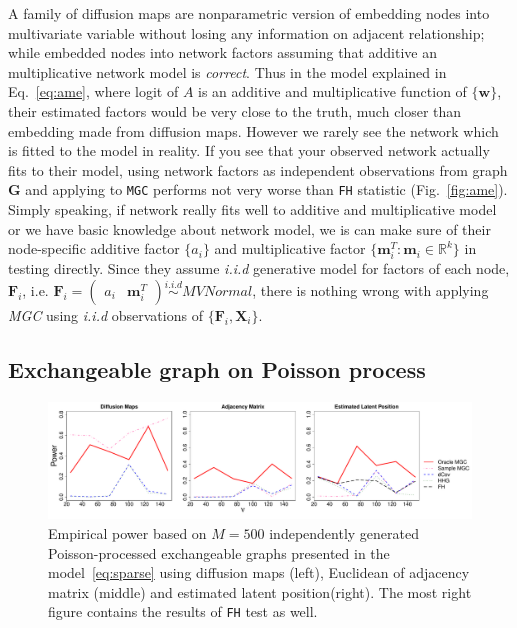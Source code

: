 \documentclass[12pt]{article}
\theoremstyle{definition}
\begin{document}
A family of diffusion maps are nonparametric version of embedding nodes into multivariate variable without losing any information on adjacent relationship; while \cite{fosdick2015testing} embedded nodes into network factors assuming that additive an multiplicative network model is \textit{correct}. Thus in the model explained in Eq.~\ref{eq:ame}, where logit of $A$ is an additive and multiplicative function of $\{\mathbf{w} \}$, their estimated factors would be very close to the truth, much closer than embedding made from diffusion maps. However we rarely see the network which is fitted to the model in reality. If you see that your observed network actually fits to their model, using network factors as independent observations from graph $\mathbf{G}$ and applying to \texttt{MGC} performs not very worse than \texttt{FH} statistic (Fig.~\ref{fig:ame}).
Simply speaking, if network really fits well to additive and multiplicative model or we have basic knowledge about network model, we is can make sure of their node-specific additive factor $\{ a_{i} \}$ and multiplicative factor $\{ \mathbf{m}^{T}_{i} : \mathbf{m}_{i} \in \mathbb{R}^{k} \}$ in testing directly. Since they assume \textit{i.i.d} generative model for factors of each node, $\mathbf{F}_{i}$, i.e. $\mathbf{F}_{i} = \begin{pmatrix} a_{i} & \mathbf{m}^{T}_{i} \end{pmatrix} \overset{i.i.d}{\sim} MVNormal$, there is nothing wrong with applying \textit{MGC} using \textit{i.i.d} observations of $\{ \mathbf{F}_{i}, \mathbf{X}_{i} \}$.   
	


\subsection{Exchangeable graph on Poisson process}

\begin{figure}[H]
	\centering
	\includegraphics[width=7in]{../Figure/sparse.pdf}
	\caption{Empirical power based on $M = 500$ independently generated Poisson-processed exchangeable graphs presented in the model~\ref{eq:sparse} using diffusion maps (left), Euclidean of adjacency matrix (middle)  and estimated latent position(right). The most right figure contains the results of \texttt{FH} test as well.}
	\label{fig:sparse}
\end{figure}
\end{document}
